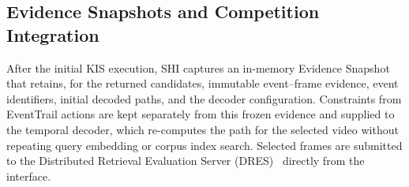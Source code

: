 \subsection{Evidence Snapshots and Competition Integration}
\label{sec:evidence-snapshots}

After the initial KIS execution, SHI captures an in-memory Evidence Snapshot
that retains, for the returned candidates, immutable event--frame evidence,
event identifiers, initial decoded paths, and the decoder configuration.
Constraints from EventTrail actions are kept separately from this frozen
evidence and supplied to the temporal decoder, which re-computes the path for
the selected video without repeating query embedding or corpus index search.
Selected frames are submitted to the Distributed Retrieval Evaluation Server
(DRES)~\cite{rossetto2021dres} directly from the interface.